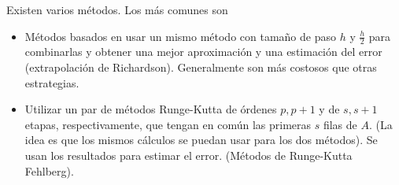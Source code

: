 \documentclass[11pt,letterpaper]{report}
\begin{document}
Existen varios métodos. Los más comunes son
\begin{itemize}
  \item
    Métodos basados en usar un mismo método con tamaño de paso $h$ y
    $\frac{h}{2}$ para combinarlas y obtener una mejor aproximación y
    una estimación del error (extrapolación de Richardson).
    Generalmente son más costosos que otras estrategias.
  \item
    Utilizar un par de métodos Runge-Kutta de órdenes $p,p+1$ y de
    $s,s+1$ etapas, respectivamente, que tengan en común las primeras
    $s$ filas de $A$. (La idea es que los mismos cálculos se puedan
    usar para los dos métodos). Se usan los resultados para estimar el
    error. (Métodos de Runge-Kutta Fehlberg).
\end{itemize}
\end{document}
